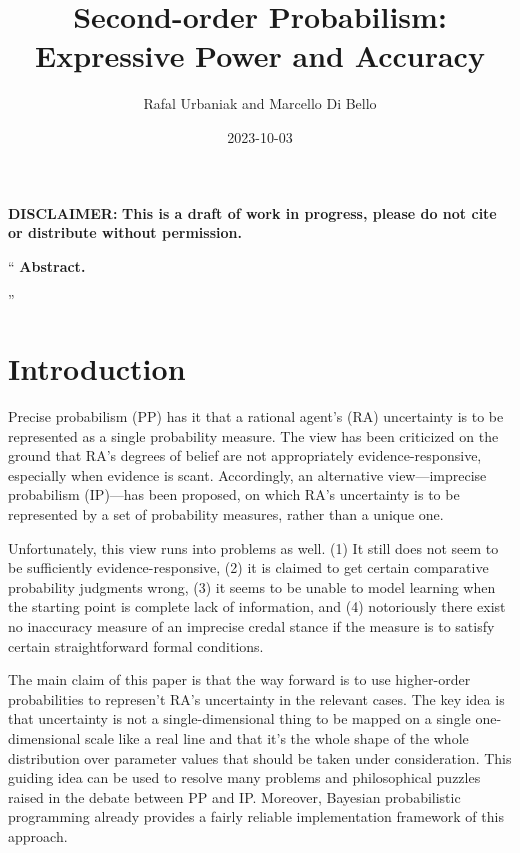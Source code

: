 \documentclass[
  10pt,
  dvipsnames,enabledeprecatedfontcommands]{scrartcl}
\title{Second-order Probabilism: Expressive Power and Accuracy}
\author{Rafal Urbaniak and Marcello Di Bello}
\date{2023-10-03}
\renewenvironment{quote}
{\list{}{\leftmargin=1em\rightmargin=1em}\item[]``}
{''\endlist}
\begin{document}
\maketitle

{
\hypersetup{linkcolor=}
\setcounter{tocdepth}{2}
\tableofcontents
}
\vspace{2cm}

\noindent \textbf{DISCLAIMER:}
\textbf{This is a draft of work in progress, please do not cite or distribute without permission.}

\thispagestyle{empty}

\newpage

\begin{quote} \textbf{Abstract.}  

\end{quote}

\hypertarget{introduction}{%
\section{Introduction}\label{introduction}}

\label{sec:introduction}

Precise probabilism (PP) has it that a rational agent's (RA) uncertainty
is to be represented as a single probability measure. The view has been
criticized on the ground that RA's degrees of belief are not
appropriately evidence-responsive, especially when evidence is scant.
Accordingly, an alternative view---imprecise probabilism (IP)---has been
proposed, on which RA's uncertainty is to be represented by a set of
probability measures, rather than a unique one.

Unfortunately, this view runs into problems as well. (1) It still does
not seem to be sufficiently evidence-responsive, (2) it is claimed to
get certain comparative probability judgments wrong, (3) it seems to be
unable to model learning when the starting point is complete lack of
information, and (4) notoriously there exist no inaccuracy measure of an
imprecise credal stance if the measure is to satisfy certain
straightforward formal conditions.


The main claim of this paper is that the way forward is to use
higher-order probabilities to represen't RA's uncertainty in the
relevant cases. The key idea is that uncertainty is not a
single-dimensional thing to be mapped on a single one-dimensional scale
like a real line and that it's the whole shape of the whole distribution
over parameter values that should be taken under consideration. This
guiding idea can be used to resolve many problems and philosophical
puzzles raised in the debate between PP and IP. Moreover, Bayesian
probabilistic programming already provides a fairly reliable
implementation framework of this approach.
\end{document}
